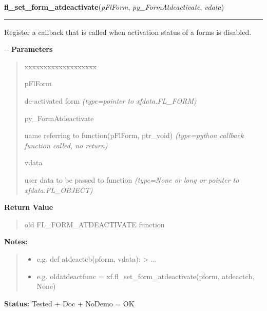 \hspace{.8\funcindent}\begin{boxedminipage}{\funcwidth}

    \raggedright \textbf{fl\_set\_form\_atdeactivate}(\textit{pFlForm}, \textit{py\_FormAtdeactivate}, \textit{vdata})

    \vspace{-1.5ex}

    \rule{\textwidth}{0.5\fboxrule}
\setlength{\parskip}{2ex}

Register a callback that is called when activation status of a forms
is disabled.

-{}-
\setlength{\parskip}{1ex}
      \textbf{Parameters}
      \vspace{-1ex}

      \begin{quote}
        \begin{Ventry}{xxxxxxxxxxxxxxxxxxx}

          \item[pFlForm]


de-activated form
            {\it (type=pointer to xfdata.FL\_FORM)}

          \item[py\_FormAtdeactivate]


name referring to function(pFlForm, ptr\_void)
            {\it (type=python callback function called, no return)}

          \item[vdata]


user data to be passed to function
            {\it (type=None or long or pointer to xfdata.FL\_OBJECT)}

        \end{Ventry}

      \end{quote}

      \textbf{Return Value}
    \vspace{-1ex}

      \begin{quote}

old FL\_FORM\_ATDEACTIVATE function
      \end{quote}

\textbf{Notes:}
\begin{quote}
  \begin{itemize}

  \item
    \setlength{\parskip}{0.6ex}

e.g. def atdeactcb(pform, vdata): > ...


  \item 
e.g. oldatdeactfunc = xf.fl\_set\_form\_atdeactivate(pform,
atdeactcb, None)


\end{itemize}

\end{quote}

\textbf{Status:} 
Tested + Doc + NoDemo = OK


    \end{boxedminipage}

